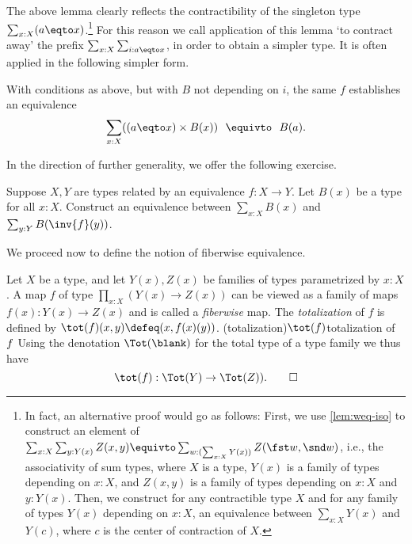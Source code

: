 The above lemma clearly reflects the  contractibility of the
singleton type $\sum_{x:X}(a \eqto x)$.\footnote{%
  In fact, an alternative proof would go as follows:
  \label{ft:Sigma-assoc}
  First, we use \cref{lem:weq-iso} to construct an element of
  $\sum_{x:X}\sum_{y:Y(x)}Z(x,y)
  \equivto \sum_{w : (\sum_{x:X}Y(x))}Z(\fst w,\snd w)$, i.e.,
  the associativity of sum types, where $X$ is a type,
  $Y(x)$ is a family of types depending on $x:X$,
  and $Z(x,y)$ is a family of types depending on $x:X$ and $y:Y(x)$.
  Then, we construct for any contractible type $X$
  and for any family of types $Y(x)$ depending on $x:X$,
  an equivalence between $\sum_{x:X}Y(x)$ and $Y(c)$,
  where $c$ is the center of contraction of $X$.}
For this reason
we call application of this lemma `to contract away'
the prefix $\sum_{x:X} \sum_{i: a \eqto x}$, in order
to obtain a simpler type. It is often applied
in the following simpler form.

\begin{corollary}\label{cor:contract-away}
With conditions as above, but with $B$ not depending on $i$, the same $f$
establishes an equivalence
\[
 \sum_{x:X} ((a \eqto x)\times B(x))~~\equivto~~B(a).
\]
\end{corollary}

In the direction of further generality, we offer the following exercise.
\begin{xca}\label{xca:sum-equiv-base}
  Suppose $X,Y$ are types related by an equivalence $f : X \to Y$.
  Let $B(x)$ be a type for all $x:X$. Construct an equivalence between
  $\sum_{x:X}B(x)$ and $\sum_{y:Y}B(\inv{f}(y))$.
\end{xca}
We proceed now to define the notion of fiberwise equivalence.

\begin{definition}\label{def:fiberwise}
Let $X$ be a type, and let $Y(x),Z(x)$ be families of types parametrized
by $x:X$. A map $f$ of type $\prod_{x:X}(Y(x)\to Z(x))$
can be viewed as a family of maps $f(x): Y(x)\to Z(x)$ and is called a
\emph{fiberwise} map. The \emph{totalization} of $f$ is defined by
$\tot(f)(x,y)\defeq (x,f(x)(y))$.
\glossary(totalization){$\protect\tot(f)$}{totalization of $\protect f$}
Using the denotation $\Tot(\blank)$ for the total type of
a type family we thus have
\[
  \tot(f) : \Tot(Y) \to \Tot(Z)).\qedhere
\]
\end{definition}

